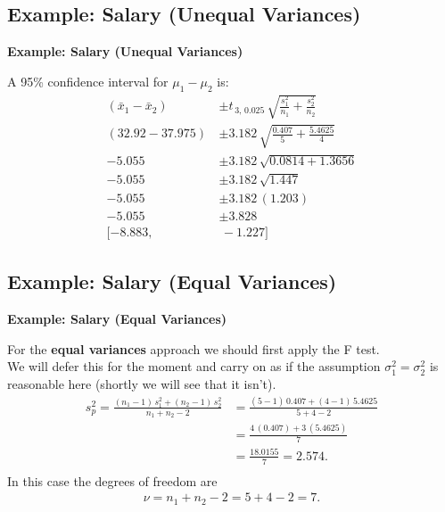 \documentclass[compress]{beamer}        %
\makeatletter
\newcommand{\tcb}{\textcolor{beamer@blendedblue}}
\makeatother
\begin{document}
\subsection{Example: Salary (Unequal Variances)}
\begin{frame}{\bf \tcb{Example: Salary (Unequal Variances)}}\label{uneqvar}

A 95\% confidence interval for $\mu_1-\mu_2$ is:
\begin{align*}
(\bar x_1 - \bar x_2) \, &\pm t_{\,3,\,0.025}\,\sqrt{\frac{s_1^2}{n_1}+\frac{s_2^2}{n_2}}\\[0.3cm]
(32.92 - 37.975) \, &\pm 3.182\,\sqrt{\frac{0.407}{5}+\frac{5.4625}{4}}\\[0.3cm]
-5.055 \, &\pm 3.182\,\sqrt{0.0814+1.3656}\\[0.2cm]
-5.055 \, &\pm 3.182\,\sqrt{1.447}\\[0.2cm]
-5.055 \, &\pm 3.182\,(1.203)\\[0.2cm]
-5.055 \, &\pm 3.828 \\[0.2cm]
[-8.883,&\, -1.227]
\end{align*}

\end{frame}


\subsection{Example: Salary (Equal Variances)}
\begin{frame}{\bf \tcb{Example: Salary (Equal Variances)}}

For the {\bf equal variances} approach we should first apply the F test.\\[0.3cm]

We will defer this for the moment and carry on as if the assumption $\sigma_1^2 = \sigma_2^2$ is reasonable here (shortly we will see that it isn't).\\[0.0cm]
\begin{align*}
s_p^2 = \frac{(n_1-1)\,s_1^2+(n_2-1)\,s_2^2}{n_1+n_2-2}
&= \frac{(5-1)\,0.407+(4-1)\,5.4625}{5+4-2} \\[0.2cm]
&= \frac{4\,(0.407)+3\,(5.4625)}{7} \\[0.2cm]
&= \frac{18.0155}{7} = 2.574.\\[-0.1cm]
\end{align*}
In this case the degrees of freedom are
\begin{align*}
\nu = n_1+n_2-2 = 5+4-2=7.
\end{align*}


\end{frame}
\end{document}
